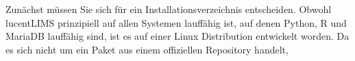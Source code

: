 Zunächst müssen Sie sich für ein Installationsverzeichnis entscheiden.
Obwohl lucentLIMS prinzipiell auf allen Systemen lauffähig ist, auf denen Python, R und MariaDB lauffähig sind, ist es auf einer Linux Distribution entwickelt worden.
Da es sich nicht um ein Paket aus einem offiziellen Repository handelt,
